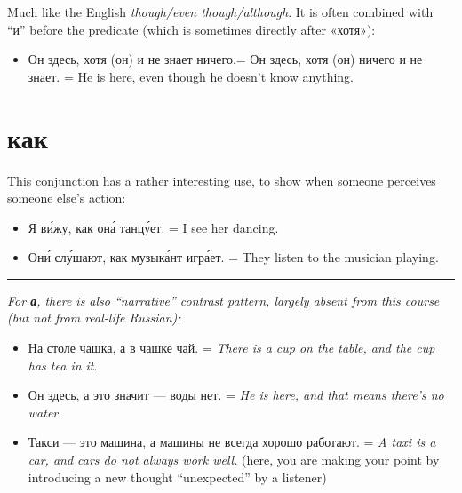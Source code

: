 Much like the English \emph{though/even though/although}. It is often
combined with ``и'' before the predicate (which is sometimes directly
after «хотя»):

\begin{itemize}
\tightlist
\item
  Он здесь, хотя (он) и не знает ничего.= Он здесь, хотя (он) ничего и
  не знает. = He is here, even though he doesn't know anything.
\end{itemize}

\section{как}\label{ux43aux430ux43a}

This conjunction has a rather interesting use, to show when someone
perceives someone else's action:

\begin{itemize}
\tightlist
\item
  Я в\'{и}жу, как он\'{а} танц\'{у}ет. = I see her dancing.
\item
  Он\'{и} сл\'{у}шают, как музык\'{а}нт игр\'{а}ет. = They listen to the musician
  playing.
\end{itemize}

\begin{center}\rule{0.5\linewidth}{\linethickness}\end{center}

\emph{For \textbf{а}, there is also ``narrative'' contrast pattern,
largely absent from this course (but not from real-life Russian):}

\begin{itemize}
\tightlist
\item
  На столе чашка, а в чашке чай. = \emph{There is a cup on the table,
  and the cup has tea in it}.
\item
  Он здесь, а это значит --- воды нет. = \emph{He is here, and that
  means there's no water}.
\item
  Такси --- это машина, а машины не всегда хорошо работают. = \emph{A
  taxi is a car, and cars do not always work well.} (here, you are
  making your point by introducing a new thought ``unexpected'' by a
  listener)
\end{itemize}
